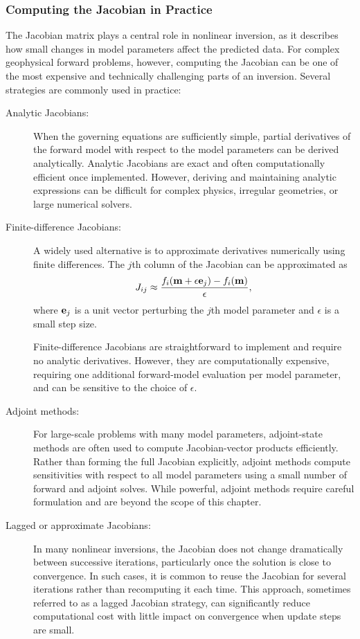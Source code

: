 \subsubsection{Computing the Jacobian in Practice}

The Jacobian matrix plays a central role in nonlinear inversion, as it describes how small changes in model parameters affect the predicted data. For complex geophysical forward problems, however, computing the Jacobian can be one of the most expensive and technically challenging parts of an inversion. Several strategies are commonly used in practice:

\begin{description}
    \item [Analytic Jacobians:] When the governing equations are sufficiently simple, partial derivatives of the forward model with respect to the model parameters can be derived analytically. Analytic Jacobians are exact and often computationally efficient once implemented. However, deriving and maintaining analytic expressions can be difficult for complex physics, irregular geometries, or large numerical solvers.

    \item [Finite-difference Jacobians:] A widely used alternative is to approximate derivatives numerically using finite differences. The $j$th column of the Jacobian can be approximated as
    \[
        J_{ij} \approx \frac{f_i(\vb{m} + \epsilon \vb{e}_j) - f_i(\vb{m})}{\epsilon},
    \]
    where $\vb{e}_j$ is a unit vector perturbing the $j$th model parameter and $\epsilon$ is a small step size.

    Finite-difference Jacobians are straightforward to implement and require no analytic derivatives. However, they are computationally expensive, requiring one additional forward-model evaluation per model parameter, and can be sensitive to the choice of $\epsilon$.

    \item [Adjoint methods:] For large-scale problems with many model parameters, adjoint-state methods are often used to compute Jacobian-vector products efficiently. Rather than forming the full Jacobian explicitly, adjoint methods compute sensitivities with respect to all model parameters using a small number of forward and adjoint solves. While powerful, adjoint methods require careful formulation and are beyond the scope of this chapter.

    \item [Lagged or approximate Jacobians:] In many nonlinear inversions, the Jacobian does not change dramatically between successive iterations, particularly once the solution is close to convergence. In such cases, it is common to reuse the Jacobian for several iterations rather than recomputing it each time. This approach, sometimes referred to as a lagged Jacobian strategy, can significantly reduce computational cost with little impact on convergence when update steps are small.
\end{description}

